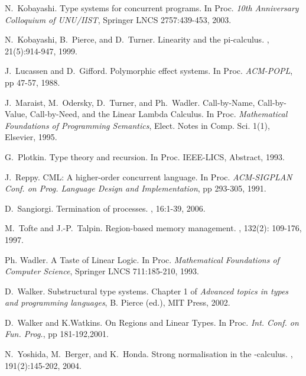 \documentclass[11pt]{article}
\begin{document}
{\begin{thebibliography}{99}
N.~Kobayashi.
\newblock Type systems for concurrent programs.
\newblock In Proc. {\em 10th Anniversary Colloquium of UNU/IIST}, 
Springer LNCS 2757:439-453, 2003.

N.~Kobayashi, B.~Pierce, and  D.~Turner. 
\newblock Linearity and the pi-calculus.
,
21(5):914-947, 1999.


J.~Lucassen and D.~Gifford.
\newblock Polymorphic effect systems.
\newblock In Proc. {\em ACM-POPL}, pp 47-57, 1988.


J.~Maraist, M.~Odersky, D.~Turner, and  Ph.~Wadler.
\newblock Call-by-Name, Call-by-Value, Call-by-Need, and the Linear Lambda Calculus.
\newblock In Proc. {\em Mathematical Foundations of Programming Semantics},  
Elect. Notes in Comp. Sci. 1(1), Elsevier, 1995.

G.~Plotkin.
\newblock Type theory and recursion.
\newblock In Proc. {IEEE-LICS}, Abstract, 1993.

J.~Reppy.
\newblock CML: A higher-order concurrent language.
\newblock In Proc. {\em ACM-SIGPLAN Conf. on Prog. Language Design and Implementation}, 
pp 293-305, 1991. 

D.~Sangiorgi.
\newblock Termination of processes.
,
16:1-39, 2006.

M.~Tofte and J.-P.~Talpin.
\newblock Region-based memory management. 
, 132(2): 109-176, 1997.


Ph. Wadler.
\newblock A Taste of Linear Logic. 
\newblock In Proc. {\em Mathematical Foundations of Computer Science},
Springer LNCS 711:185-210, 1993.


D.~Walker.
\newblock Substructural type systems.
\newblock Chapter 1 of {\em Advanced topics in types and programming languages},
B. Pierce (ed.), MIT Press, 2002.

D.~Walker and K.Watkins.
\newblock On Regions and Linear Types. 
\newblock In Proc. {\em Int. Conf. on Fun. Prog.}, pp 181-192,2001.

N.~Yoshida, M.~Berger, and K.~Honda.
\newblock Strong normalisation in the -calculus. 
, 191(2):145-202, 2004.


\end{thebibliography}}
\end{document}
